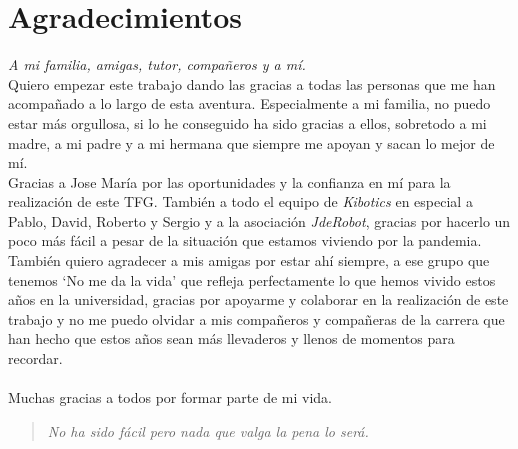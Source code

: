 \newpage
\mbox{}
\thispagestyle{plain}			%
\section*{Agradecimientos}

\textit{A mi familia, amigas, tutor, compañeros y a mí.}\\

Quiero empezar este trabajo dando las gracias a todas las personas que me han acompañado a lo largo de esta aventura. Especialmente a mi familia, no puedo estar más orgullosa, si lo he conseguido ha sido gracias a ellos, sobretodo a mi madre, a mi padre y a mi hermana que siempre me apoyan y sacan lo mejor de mí. \\ 

Gracias a Jose María por las oportunidades y la confianza en mí para la realización de este TFG. También a todo el equipo de \textit{Kibotics} en especial a Pablo, David, Roberto y Sergio y a la asociación \textit{JdeRobot}, gracias por hacerlo un poco más fácil a pesar de la situación que estamos viviendo por la pandemia.\\


También quiero agradecer a mis amigas por estar ahí siempre, a ese grupo que tenemos `No me da la vida' que refleja perfectamente lo que hemos vivido estos años en la universidad, gracias por apoyarme y colaborar en la realización de este trabajo y no me puedo olvidar a mis compañeros y compañeras de la carrera que han hecho que estos años sean más llevaderos y llenos de momentos para recordar.
\\\\
Muchas gracias a todos por formar parte de mi vida. \\

\begin{quote}
  \raggedleft
  \textit{No ha sido fácil pero nada que valga la pena lo será.}
\end{quote}






